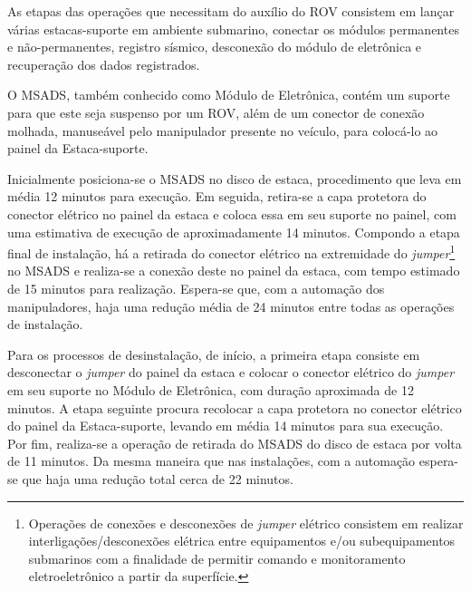 As etapas das operações que necessitam do auxílio do ROV consistem em lançar várias estacas-suporte em ambiente submarino, conectar os módulos permanentes e não-permanentes, registro sísmico, desconexão do módulo de eletrônica e recuperação dos dados registrados.  

O MSADS, também conhecido como Módulo de Eletrônica, contém um suporte para que este seja suspenso por um ROV, além de um conector de conexão molhada, manuseável pelo manipulador presente no veículo, para colocá-lo ao painel da Estaca-suporte. 

Inicialmente posiciona-se o MSADS no disco de estaca, procedimento que leva em média 12 minutos para execução. Em seguida, retira-se a capa protetora do conector elétrico no painel da estaca e coloca essa em seu suporte no painel, com uma estimativa de execução de aproximadamente 14 minutos. Compondo a etapa final de instalação, há a retirada do conector elétrico na extremidade do \textit{jumper}\footnote{Operações de conexões e desconexões de \textit{jumper} elétrico consistem em realizar interligações/desconexões elétrica entre equipamentos e/ou subequipamentos submarinos com a finalidade de permitir comando e monitoramento eletroeletrônico a partir da superfície.}  no MSADS e realiza-se a conexão deste no painel da estaca, com tempo estimado de 15 minutos para realização. Espera-se que, com a automação dos manipuladores, haja uma redução média de 24 minutos entre todas as operações de instalação.

Para os processos de desinstalação, de início, a primeira etapa consiste em desconectar o \textit{jumper} do painel da estaca e colocar o conector elétrico do \textit{jumper} em seu suporte no Módulo de Eletrônica, com duração aproximada de 12 minutos. A etapa seguinte procura recolocar a capa protetora no conector elétrico do painel da Estaca-suporte, levando em média 14 minutos para sua execução. Por fim, realiza-se a operação de retirada do MSADS do disco de estaca por volta de 11 minutos. Da mesma maneira que nas instalações, com a automação espera-se que haja uma redução total cerca de 22 minutos.

